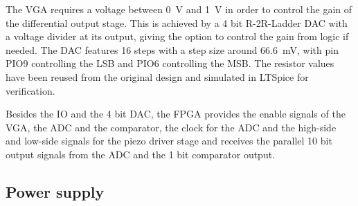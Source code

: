 \documentclass[
	english,
	ruledheaders=section, %
	class=report,%
	thesis={type=Project Seminar Report},%
	accentcolor=TUDa-1d, %
	custommargins=false,%
	marginpar=false,%
	parskip=half-,%
	fontsize=11pt,%
]{tudapub}
\begin{document}
The \gls{VGA} requires a voltage between \SI{0}{\volt} and \SI{1}{\volt} in order to control the gain of the differential output stage. This is achieved by a 4 bit R-2R-Ladder \gls{DAC} with a voltage divider at its output, giving the option to control the gain from logic if needed. The \gls{DAC} features 16 steps with a step size around \SI{66.6}{\milli\volt}, with pin PIO9 controlling the \gls{LSB} and PIO6 controlling the \gls{MSB}. The resistor values have been reused from the original design and simulated in LTSpice for verification.

Besides the \gls{IO} and the 4 bit \gls{DAC}, the \gls{FPGA} provides the enable signals of the \gls{VGA}, the \gls{ADC} and the comparator, the clock for the \gls{ADC} and the high-side and low-side signals for the piezo driver stage and receives the parallel 10 bit output signals from the \gls{ADC} and the 1 bit comparator output.

\subsection{Power supply}
\end{document}
